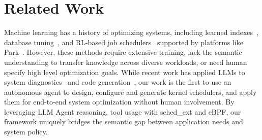 \section{Related Work}
\label{sec:related}

Machine learning has a history of optimizing systems, including learned indexes~\cite{kraska2018learned}, database tuning~\cite{marcus2019neo,vanaken2017ottertune}, and RL-based job schedulers~\cite{mao2019decima,qiu2020firm,zhang2024mrsch} supported by platforms like Park~\cite{mao2019park}. However, these methods require extensive training, lack the semantic understanding to transfer knowledge across diverse workloads, or need human specify high level optimization goals. While recent work has applied LLMs to system diagnostics~\cite{wang2024llmsys} and  code generation~\cite{wei2024mapper,10.1145/3672197.3673434}, our work is the first to use an autonomous agent to design, configure and generate kernel schedulers, and apply them for end-to-end system optimization without human involvement. By leveraging LLM Agent reasoning, tool usage with sched\_ext and eBPF, our framework uniquely bridges the semantic gap between application needs and system policy.

